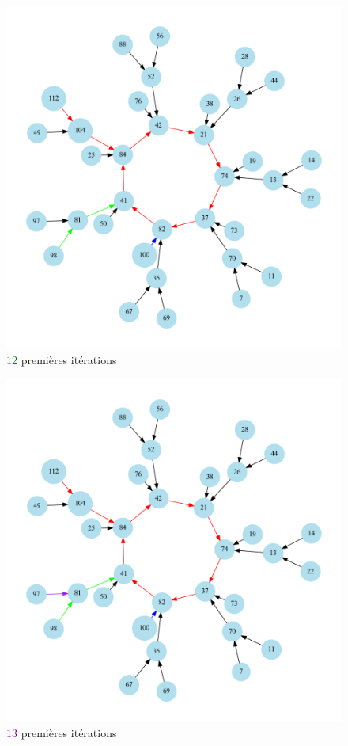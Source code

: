\begin{frame}
\begin{figure}
\includegraphics[scale=0.33]{./images/graph4}
\caption{\textcolor{green}{$12$} premi\`eres it\'erations}
\end{figure}
\end{frame}

\begin{frame}
\begin{figure}
\includegraphics[scale=0.33]{./images/graph5}
\caption{\textcolor{purple}{$13$} premi\`eres it\'erations}
\end{figure}
\end{frame}

